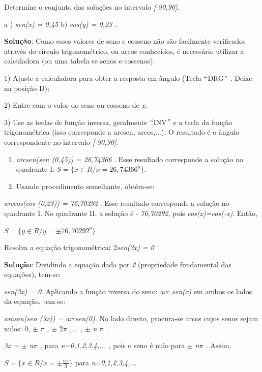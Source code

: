 \begin{texemplo}
Determine o conjunto das soluções no intervalo \textit{[-90\degree ,90\degree ]}.

a ) \textit{sen(x) = 0,45}     \tab \tab b) \textit{cos(y) = 0,23}  .

\textbf{Solução}: Como esses valores de seno e cosseno não são facilmente verificados através do círculo trigonométrico, ou arcos conhecidos, é necessário utilizar a calculadora (ou uma tabela se senos e cossenos):

1\degree) Ajuste a calculadora para obter a resposta em ângulo (Tecla $``$DRG$"$ . Deixe na posição D);

2\degree) Entre com o valor do seno ou cosseno de \textit{x};

3\degree) Use as teclas de função inversa, geralmente $``$INV$"$  e a tecla da função trigonométrica (isso corresponde a arcsen, arcos,...). O resultado é o ângulo correspondente no intervalo \textit{[-90\degree ,90\degree ]}.

\begin{enumerate}
    \item \textit{arcsen(sen (0,45)) = 26,74366\degree} . Esse resultado corresponde a solução no quadrante I:  $ S= \{ x \in R / x=26,74366^{o} \}  $.

    \item Usando procedimento semelhante, obtém-se:
\end{enumerate}

\textit{arccos(cos (0,23)) =  76,70292\degree} . Esse resultado corresponde a solução no quadrante I. No quadrante II, a solução é - \textit{76,70292\degree}, pois \textit{cos(x)=cos(-x)}.  Então,

 \( S= \{ y \in R / y= \pm 76,70292^{o} \}   \)  \qedsymbol
\end{texemplo}

\begin{texemplo}
Resolva a equação trigonométrica\textbf{:  }2\textit{sen(3x) = 0} 

\textbf{Solução}: Dividindo a equação dada por \textit{2} (propriedade fundamental das equações), tem-se:

\textit{sen(3x) = 0}. Aplicando a função inversa do seno: \textit{arc sen(x)} em ambos os lados da equação, tem-se:

\textit{arcsen(sen (3x)) = arcsen(0). }No lado direito, procura-se arcos cujos senos sejam nulos: 0, $ \pm $  \textit{$ \pi $ , }$ \pm $  2\textit{$ \pi $ ,$ \ldots $ , }$ \pm $  \textit{n} \textit{$ \pi $ .}

\textit{3x = }$ \pm $  \textit{n$ \pi $ , }para\textit{ n=0,1,2,3,4,...  , }pois o seno é nulo para $ \pm $ \textit{n$ \pi $ .   }Assim,

\( S= \{ x \in R / x= \pm \frac{n \pi }{3} \} \) para \textit{n=0,1,2,3,4,...} \qedsymbol
\end{texemplo}

